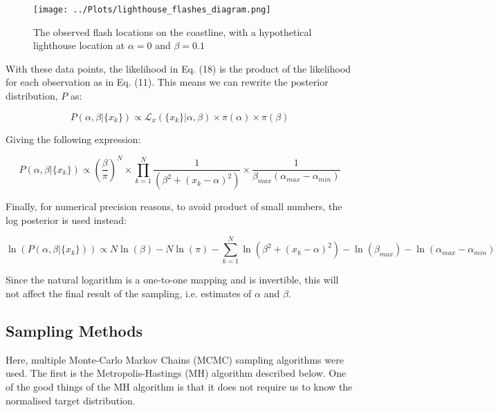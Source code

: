 \documentclass[12pt]{report} %
\begin{document}
\begin{figure}[h]
\centering
\texttt{[image: ../Plots/lighthouse\_flashes\_diagram.png]}
\caption{The observed flash locations on the coastline, with a hypothetical lighthouse location at $\alpha = 0$ and $\beta = 0.1$}
\label{fig:observations}
\end{figure}

\newpage

With these data points, the likelihood in Eq. (18) is the product of the likelihood for each observation as in Eq. (11). This means we can rewrite the posterior distribution, $P$ as:

\begin{equation}
    P(\alpha, \beta | \{x_{k}\}) \propto \mathcal{L}_{x}(\{x_{k}\} | \alpha, \beta) \times \pi(\alpha) \times \pi(\beta)
\end{equation}

Giving the following expression:

\begin{equation}
    P(\alpha, \beta | \{x_{k}\}) \propto (\frac{\beta}{\pi})^{N} \times \prod_{k=1}^{N}\frac{1}{(\beta^{2} + (x_{k} - \alpha)^{2})} \times \frac{1}{\beta_{max}(\alpha_{max} - \alpha_{min})}
\end{equation}

Finally, for numerical precision reasons, to avoid product of small numbers, the log posterior is used instead:

\begin{equation}
    \ln(P(\alpha, \beta | \{x_{k}\})) \propto N\ln(\beta) - N\ln(\pi) - \sum_{k=1}^{N}\ln(\beta^{2} + (x_{k} - \alpha)^{2}) - \ln(\beta_{max}) - \ln(\alpha_{max} - \alpha_{min})
\end{equation}

Since the natural logarithm is a one-to-one mapping and is invertible, this will not affect the final result of the sampling, i.e. estimates of $\alpha$ and $\beta$.

\subsection*{Sampling Methods}

Here, multiple Monte-Carlo Markov Chains (MCMC) sampling algorithms were used. The first is the Metropolis-Hastings (MH) algorithm described below. One of the good things of the MH algorithm is that it does not require us to know the normalised target distribution.
\end{document}
